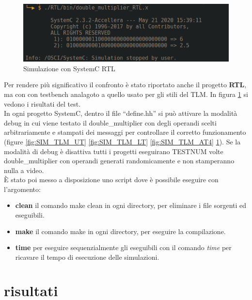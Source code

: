 \documentclass[]{IEEEtran}
\begin{document}
\begin{figure}[!htb]
    \centering
    \includegraphics[width=\linewidth]{figures/SIM_RTL.png}
    \caption{Simulazione con SystemC RTL}
    \label{fig:SIM_RTL}
\end{figure}
Per rendere più significativo il confronto è stato riportato anche il progetto \textbf{RTL}, ma con con testbench analagoto a quello usato per gli stili del TLM. In figura \ref{fig:SIM_RTL} si vedono i risultati del test.
\\In ogni progetto SystemC, dentro il file ``define.hh'' si può attivare la modalità debug in cui viene testato il double\_multiplier con degli operandi scelti arbitrariamente e stampati dei messaggi per controllare il corretto funzionamento (figure \ref{fig:SIM_TLM_UT} \ref{fig:SIM_TLM_LT} \ref{fig:SIM_TLM_AT4} \ref{fig:SIM_RTL}). Se la modalità di debug è disattiva tutti i progetti eseguirano TESTNUM volte double\_multiplier con operandi generati randomicamente e non stamperanno nulla a video.
\\È stato poi messo a disposizione uno script dove è possibile eseguire con l'argomento:
\begin{itemize}
    \item \textbf{clean} il comando make clean in ogni directory, per eliminare i file sorgenti ed eseguibili.
    \item \textbf{make} il comando make in ogni directory, per eseguire la compilazione.
    \item \textbf{time} per eseguire sequenzialmente gli eseguibili con il comando \textit{time} per ricavare il tempo di esecuzione delle simulazioni.
\end{itemize}



\section{risultati}
\end{document}
